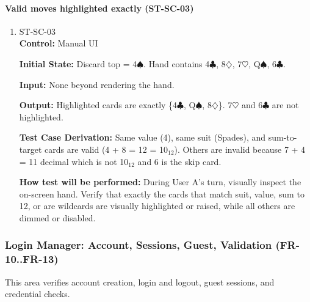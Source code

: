 \documentclass[12pt, titlepage]{article}
\begin{document}
\paragraph{Valid moves highlighted exactly (ST-SC-03)}
\begin{enumerate}
\item{ST-SC-03\\}
\textbf{Control:} Manual UI

\textbf{Initial State:} Discard top = 4$\spadesuit$. Hand contains 4$\clubsuit$, 8$\diamondsuit$, 7$\heartsuit$, Q$\spadesuit$, 6$\clubsuit$.

\textbf{Input:} None beyond rendering the hand.

\textbf{Output:} Highlighted cards are exactly \{4$\clubsuit$, Q$\spadesuit$, 8$\diamondsuit$\}. 7$\heartsuit$ and 6$\clubsuit$ are not highlighted.

\textbf{Test Case Derivation:} Same value (4), same suit (Spades), and sum-to-target cards are valid (4 + 8 = 12 = 10$_{12}$). Others are invalid because 7 + 4 = 11 decimal which is not 10$_{12}$ and 6 is the skip card.

\textbf{How test will be performed:} During User A's turn, visually inspect the on-screen hand. Verify that exactly the cards that match suit, value, sum to 12, or are wildcards are visually highlighted or raised, while all others are dimmed or disabled.
\end{enumerate}


\subsubsection{Login Manager: Account, Sessions, Guest, Validation (FR-10..FR-13)}

This area verifies account creation, login and logout, guest sessions, and credential checks.
\end{document}

